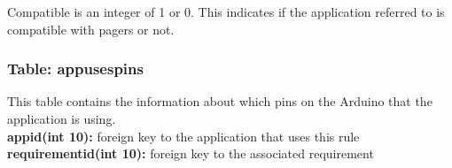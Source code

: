 			Compatible is an integer of 1 or 0. This indicates if the application referred to is compatible with pagers or not.

		\subsubsection{Table: appusespins}

			This table contains the information about which pins on the Arduino that the application is using.\\
			
			\textbf{appid(int 10):} foreign key to the application that uses this rule \\
			\textbf{requirementid(int 10):} foreign key to the associated requirement \\

